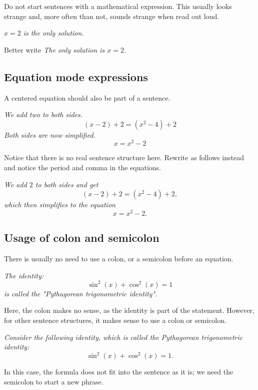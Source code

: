 Do not start sentences with a mathematical expression.
This usually looks strange and, more often than not, sounds strange when read
out loud.

\begin{example}
\emph{$x=2$ is the only solution.}

Better write
\emph{The only solution is $x=2$.}
\end{example}




\subsection[mistakesEquationMode]{Equation mode expressions}

A centered equation should also be part of a sentence.

\begin{example}
\emph{We add two to both sides.}
\[
(x-2) + 2 = (x^2-4)+2
\]
\emph{Both sides are now simplified.}
\[
x = x^2-2
\]

Notice that there is no real sentence structure here.
Rewrite as follows instead
and notice the period and comma in the equations.

\emph{We add $2$ to both sides and get
\[
(x-2) + 2 = (x^2-4)+2,
\]
which then simplifies to the equation
\[
x = x^2-2.
\]
}
\end{example}


\subsection[mistakesColon]{Usage of colon and semicolon}

There is usually no need to use a colon, or a semicolon before an equation.

\begin{example}
\emph{The identity:}
\[
\sin^2(x) + \cos^2(x)=1
\]
\emph{is called the "Pythagorean trigonometric identity".}

Here, the colon makes no sense, as the identity is part of the statement.
However, for other sentence structures, it makes sense to use a colon or semicolon.

\emph{Consider the following identity, which is called the Pythagorean trigonometric identity:}
\[
\sin^2(x) + \cos^2(x)=1.
\]

In this case, the formula does not fit into the sentence as it is; we need the
semicolon to start a new phrase.
\end{example}






